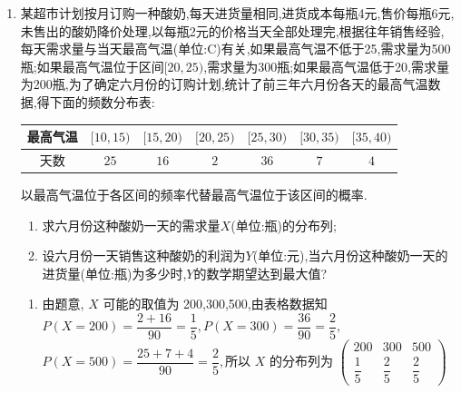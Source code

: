\begin{enumerate}
    \item 某超市计划按月订购一种酸奶,每天进货量相同,进货成本每瓶4元,售价每瓶6元,未售出的酸奶降价处理,以每瓶2元的价格当天全部处理完,根据往年销售经验,每天需求量与当天最高气温(单位:C)有关,如果最高气温不低于25,需求量为500瓶;如果最高气温位于区间$[20,25)$,需求量为300瓶;如果最高气温低于20,需求量为200瓶,为了确定六月份的订购计划,统计了前三年六月份各天的最高气温数据,得下面的频数分布表:
    \begin{center}
    \begin{tabular}{|c|c|c|c|c|c|c|}
    \hline
    最高气温 & $[10, 15)$ & $[15, 20)$ & $[20, 25)$ & $[25, 30)$ & $[30, 35)$ & $[35, 40)$ \\
    \hline
    天数 & $25$ & $16$ & $2$ & $36$ & $7$ & $4$ \\
    \hline
    \end{tabular}
    \end{center}
    以最高气温位于各区间的频率代替最高气温位于该区间的概率.
    \begin{enumerate}
    \item 求六月份这种酸奶一天的需求量$X$(单位:瓶)的分布列;
    \item 设六月份一天销售这种酸奶的利润为$Y$(单位:元),当六月份这种酸奶一天的进货量(单位:瓶)为多少时,$Y$的数学期望达到最大值?
    \end{enumerate}
    
    \begin{jieda}
        \begin{enumerate}
            \item 由题意, $X$ 可能的取值为 200,300,500,由表格数据知$P\left( {X = {200}}\right)  = \dfrac{2 + {16}}{90} = \dfrac{1}{5},P\left( {X = {300}}\right)  = \dfrac{36}{90} = \dfrac{2}{5},$$P\left( {X = {500}}\right)  = \dfrac{{25} + 7 + 4}{90} = \dfrac{2}{5},$所以 $X$ 的分布列为
            $\begin{pmatrix}
             200 & 300& 500\\
             \dfrac{1}{5} & \dfrac{2}{5} & \dfrac{2}{5}
            \end{pmatrix}$
    

\end{enumerate}
\end{jieda}
\end{enumerate}
